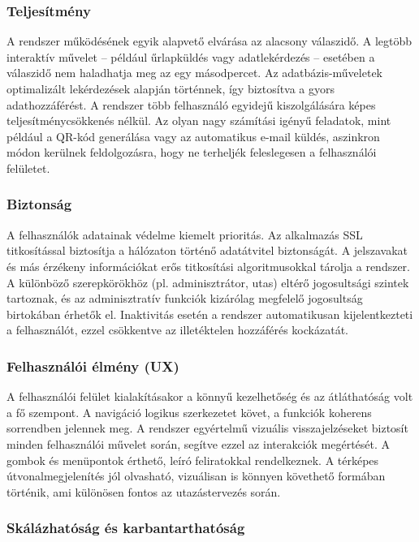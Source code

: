 \subsubsection{Teljesítmény}

A rendszer működésének egyik alapvető elvárása az alacsony válaszidő. A legtöbb interaktív művelet – például űrlapküldés vagy adatlekérdezés – esetében a válaszidő nem haladhatja meg az egy másodpercet. Az adatbázis-műveletek optimalizált lekérdezések alapján történnek, így biztosítva a gyors adathozzáférést. A rendszer több felhasználó egyidejű kiszolgálására képes teljesítménycsökkenés nélkül. Az olyan nagy számítási igényű feladatok, mint például a QR-kód generálása vagy az automatikus e-mail küldés, aszinkron módon kerülnek feldolgozásra, hogy ne terheljék feleslegesen a felhasználói felületet.

\subsubsection{Biztonság}

A felhasználók adatainak védelme kiemelt prioritás. Az alkalmazás SSL titkosítással biztosítja a hálózaton történő adatátvitel biztonságát. A jelszavakat és más érzékeny információkat erős titkosítási algoritmusokkal tárolja a rendszer. A különböző szerepkörökhöz (pl. adminisztrátor, utas) eltérő jogosultsági szintek tartoznak, és az adminisztratív funkciók kizárólag megfelelő jogosultság birtokában érhetők el. Inaktivitás esetén a rendszer automatikusan kijelentkezteti a felhasználót, ezzel csökkentve az illetéktelen hozzáférés kockázatát.

\subsubsection{Felhasználói élmény (UX)}

A felhasználói felület kialakításakor a könnyű kezelhetőség és az átláthatóság volt a fő szempont. A navigáció logikus szerkezetet követ, a funkciók koherens sorrendben jelennek meg. A rendszer egyértelmű vizuális visszajelzéseket biztosít minden felhasználói művelet során, segítve ezzel az interakciók megértését. A gombok és menüpontok érthető, leíró feliratokkal rendelkeznek. A térképes útvonalmegjelenítés jól olvasható, vizuálisan is könnyen követhető formában történik, ami különösen fontos az utazástervezés során.

\subsubsection{Skálázhatóság és karbantarthatóság}

